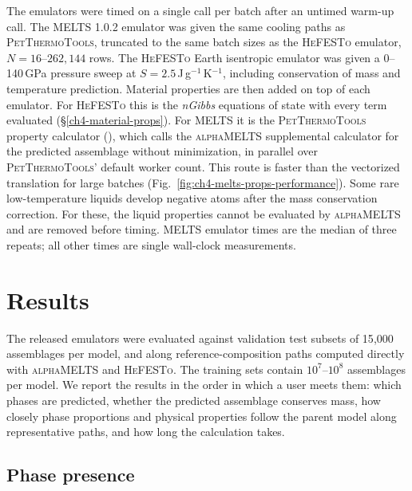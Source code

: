 The emulators were timed on a single  call per batch after an untimed warm-up call. The \textsc{MELTS}
1.0.2 emulator was given the same cooling paths as \textsc{PetThermoTools}, truncated to the same batch sizes as the \textsc{HeFESTo} emulator, $N = 16$--$262{,}144$ rows. The \textsc{HeFESTo}
Earth isentropic emulator was given a 0--140\,GPa pressure sweep at $S = 2.5$\,J\,g$^{-1}$\,K$^{-1}$, including conservation of mass and temperature
prediction. Material properties are then added on top of each emulator. For \textsc{HeFESTo} this is the \emph{nGibbs} equations of state with every
term evaluated (\S\ref{ch4-material-props}). For \textsc{MELTS} it is the \textsc{PetThermoTools} property calculator
(), which calls the \textsc{alphaMELTS} supplemental calculator for the predicted assemblage
without minimization, in parallel over \textsc{PetThermoTools}' default worker count. This route is faster than the vectorized
translation for large batches (Fig.~\ref{fig:ch4-melts-props-performance}). Some rare low-temperature liquids develop negative atoms after the mass conservation
correction. For these, the liquid properties cannot be evaluated by \textsc{alphaMELTS} and are removed before timing. \textsc{MELTS} emulator times are the 
median of three repeats; all other times are single wall-clock measurements.

\section{Results}\label{ch4-results}





The released emulators were evaluated against validation test subsets of 15{,}000 assemblages per model, 
and along reference-composition paths computed directly with \textsc{alphaMELTS} and
\textsc{HeFESTo}. The training sets contain $10^7$--$10^8$ assemblages per model. We report the results in the order in which a
user meets them: which phases are predicted, whether the predicted assemblage conserves mass, how closely phase proportions and
physical properties follow the parent model along representative paths, and how long the calculation takes.

\subsection{Phase presence}\label{ch4-results-presence}

